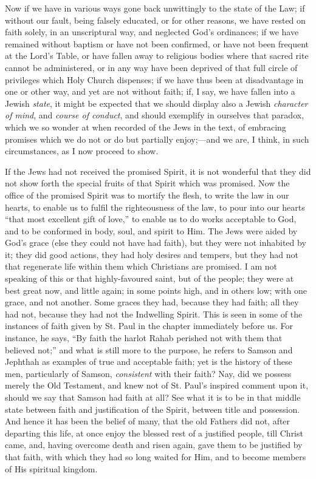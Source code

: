 Now if we have in various ways gone back unwittingly to the state
of the Law; if without our fault, being falsely educated, or for other
reasons, we have rested on faith solely, in an unscriptural way, and
neglected God's ordinances; if we have remained without baptism or
have not been confirmed, or have not been frequent at the Lord's
Table, or have fallen away to religious bodies where that sacred rite
cannot be administered, or in any way have been deprived of that full
circle of privileges which Holy Church dispenses; if we have thus been
at disadvantage in one or other way, and yet are not without faith;
if, I say, we have fallen into a Jewish \emph{state}, it might be
expected that we should display also a Jewish \emph{character of mind},
and \emph{course of conduct}, and should exemplify in ourselves that
paradox, which we so wonder at when recorded of the Jews in the text,
of embracing promises which we do not or do but partially enjoy;—and
we are, I think, in such circumstances, as I now proceed to show.

If the Jews had not received the promised Spirit, it is not
wonderful that they did not show forth the special fruits of that
Spirit which was promised. Now the office of the promised Spirit was
to mortify the flesh, to write the law in our hearts, to enable us to
fulfil the righteousness of the law, to pour into our hearts
``that most excellent gift of love,'' to enable us to do works
acceptable to God, and to be conformed in body, soul, and spirit to
Him. The Jews were aided by God's grace (else they could not have had
faith), but they were not inhabited by it; they did good actions, they
had holy desires and tempers, but they had not that regenerate life
within them which Christians are promised. I am not speaking of this
or that highly-favoured saint, but of the people; they were at best
great now, and little again; in some points high, and in others low;
with one grace, and not another. Some graces they had, because they
had faith; all they had not, because they had not the Indwelling
Spirit. This is seen in some of the instances of faith given by St.
Paul in the chapter immediately before us. For instance, he says,
``By faith the harlot Rahab perished not with them that believed
not;'' and what is still more to the purpose, he refers to Samson
and Jephthah as examples of true and acceptable faith; yet is the
history of these men, particularly of Samson, \emph{consistent} with
their faith? Nay, did we possess merely the Old Testament, and knew
not of St. Paul's inspired comment upon it, should we say that Samson
had faith at all? See what it is to be in that middle state between
faith and justification of the Spirit, between title and possession.
And hence it has been the belief of many, that the old Fathers did
not, after departing this life, at once enjoy the blessed rest of a
justified people, till Christ came, and, having overcome death and
risen again, gave them to be justified by that faith, with which they
had so long waited for Him, and to become members of His spiritual
kingdom.

